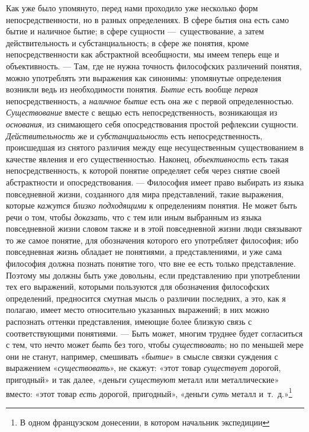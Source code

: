 \documentclass[twoside]{article}
\begin{document}
{{{{{{Как уже было упомянуто, перед нами проходило уже несколько
форм непосредственности, но в разных определениях. В сфере бытия она есть
само бытие и наличное бытие; в сфере сущности
—~существование, а затем действительность и
субстанциальность; в сфере же понятия, кроме непосредственности как
абстрактной всеобщности, мы имеем теперь еще и объективность. —
Там, где не нужна точность философских различений понятия,
можно употреблять эти выражения как синонимы: упомянутые определения
возникли ведь из необходимости понятия.
{\em Бытие} есть вообще
{\em первая}
непосредственность, а
{\em наличное бытие} есть
она же с первой определенностью.
{\em Существование}
вместе с вещью есть непосредственность, возникающая из
{\em основания}, из
снимающего себя опосредствования простой рефлексии сущности.
{\em Действительность} же
и {\em субстанциальность}
есть непосредственность, происшедшая из снятого различия
между еще несущественным существованием в качестве явления и его
существенностью. Наконец,
{\em объективность} есть
такая непосредственность, к которой понятие определяет себя через снятие
своей абстрактности и опосредствования. — Философия имеет
право выбирать из языка повседневной жизни, созданного для мира
представлений, такие выражения, которые
{\em кажутся близко подходящими}
к определениям понятия. Не может быть речи о том, чтобы
{\em доказать}, что с тем
или иным выбранным из языка повседневной жизни словом также и в этой
повседневной жизни люди связывают то же самое понятие, для обозначения
которого его употребляет философия; ибо повседневная жизнь
обладает не понятиями, а представлениями, и уже сама философия должна
познать понятие того, что вне ее есть только представление. Поэтому мы
должны быть уже довольны, если представлению при употреблении тех его
выражений, которыми пользуются для обозначения философских определений,
предносится смутная мысль о различии последних, а это, как я полагаю, имеет
место относительно указанных выражений; в них можно распознать оттенки
представления, имеющие более близкую связь с соответствующими понятиями. —
Быть может, многим труднее будет согласиться с тем, что нечто
может {\em быть} без
того, чтобы {\em существовать};
но по меньшей мере они не станут, например, смешивать
«{\em бытие}» в смысле
связки суждения с выражением
«{\em существовать}», не
скажут: «этот товар {\em существует}
дорогой, пригодный» и так далее, «деньги
{\em существуют} металл
или металлические» вместо: «этот товар
{\em есть} дорогой,
пригодный», «деньги {\em суть}
металл и~т.~д.»\footnote{
В одном французском донесении, в котором начальник экспедиции
}}}}}}}
\end{document}
